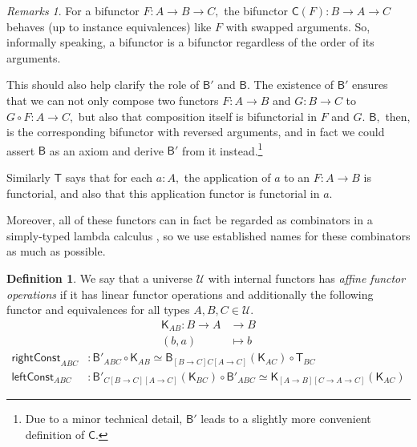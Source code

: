 \documentclass[a4paper]{article}
\theoremstyle{definition}
\newtheorem{definition}{Definition}[section]
\theoremstyle{remark}
\newtheorem*{remarks}{Remarks}
\newcommand{\defn}{\emph}
\renewcommand{\equiv}{\simeq}
\newcommand{\U}{\mathcal{U}}
\newcommand{\nm}{\mathsf}
\newcommand{\combinator}{\nm}
\newcommand{\revAppFun}{\combinator{T}}
\newcommand{\constFun}{\combinator{K}}
\newcommand{\compFun}{\combinator{B'}}
\newcommand{\revCompFun}{\combinator{B}}
\newcommand{\swapFun}{\combinator{C}}
\begin{document}
\begin{remarks}
  For a bifunctor $F : A \to B \to C,$ the bifunctor $\swapFun(F) : B \to A \to C$ behaves
  (up to instance equivalences) like $F$ with swapped arguments. So, informally speaking,
  a bifunctor is a bifunctor regardless of the order of its arguments.

  This should also help clarify the role of $\compFun$ and $\revCompFun.$ The existence
  of $\compFun$ ensures that we can not only compose two functors $F : A \to B$ and
  $G : B \to C$ to $G \circ F : A \to C,$ but also that composition itself is bifunctorial
  in $F$ and $G.$ $\revCompFun,$ then, is the corresponding bifunctor with reversed
  arguments, and in fact we could assert $\revCompFun$ as an axiom and derive $\compFun$
  from it instead.\footnote{Due to a minor technical detail, $\compFun$ leads to a slightly
  more convenient definition of $\swapFun.$}

  Similarly $\revAppFun$ says that for each $a : A,$ the application of $a$ to an
  $F : A \to B$ is functorial, and also that this application functor is functorial in
  $a.$

  Moreover, all of these functors can in fact be regarded as combinators \cite{combinators}
  in a simply-typed lambda calculus \cite{simply-typed-lambda-calculus}, so we use
  established names for these combinators as much as possible.
\end{remarks}

\vspace{1ex}
\begin{definition}
  We say that a universe $\U$ with internal functors has \defn{affine functor
  operations} if it has linear functor operations and additionally the following functor
  and equivalences for all types $A,B,C \in \U.$
  \begin{align*}
    \constFun_{AB} : B \to A &\to     B\\
                     (b,a)   &\mapsto b
  \end{align*}
  \begin{align*}
    \nm{rightConst}_{ABC} &: \compFun_{ABC} \circ \constFun_{AB} \equiv \revCompFun_{[B{\to}C]C[A{\to}C]}(\constFun_{AC}) \circ \revAppFun_{BC}\\
    \nm{leftConst}_{ABC}  &: \compFun_{C[B{\to}C][A{\to}C]}(\constFun_{BC}) \circ \compFun_{ABC} \equiv \constFun_{[A{\to}B][C{\to}A{\to}C]}(\constFun_{AC})
  \end{align*}
\end{definition}
\end{document}
